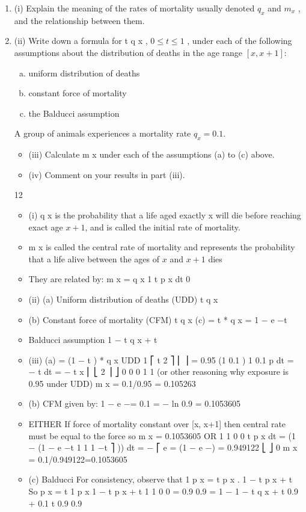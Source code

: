 \documentclass[a4paper,12pt]{article}
\begin{document}
\begin{enumerate}
\item (i) Explain the meaning of the rates of mortality usually denoted $q_x$ and $m_x$ , and the relationship between them.

\item (ii) Write down a formula for t q x , $0 \leq t \leq 1$ , under each of the following assumptions about the distribution of deaths in the age range $[x, x+1]$:
\begin{enumerate}[(a)]
\item uniform distribution of deaths
\item constant force of mortality
\item the Balducci assumption
\end{enumerate}
\medskip
A group of animals experiences a mortality rate $q_x = 0.1$.

\begin{itemize}
\item (iii) Calculate m x under each of the assumptions (a) to (c) above.
\item (iv) Comment on your results in part (iii).
\end{itemize}

\newpage
12
\begin{itemize}
\item (i)
q x is the probability that a life aged exactly x will die before reaching exact age $x+1$, and is called the initial rate of mortality.
\item m x is called the central rate of mortality and represents the probability that a life alive between the ages of $x$ and $x+1$ dies
\item They are related by:
m x =
q x
1
\int t p x dt
0
\item 
(ii)
(a)
Uniform distribution of deaths (UDD)
t q x
\item (b)
Constant force of mortality (CFM)
t q x
(c)
= t * q x
= 1 − e −\mu * t
\item Balducci assumption
1 − t q x + t
\item (iii)
(a)
= (1 − t ) * q x
UDD
1
⎡ t 2 ⎤
⎢ ⎥ = 0.95
(1
0.1
)
1
0.1
p
dt
=
−
t
dt
=
−
\int t x \int
⎢ ⎣ 2 ⎥ ⎦
0
0
0
1
1
(or other reasoning why exposure is 0.95
under UDD)
m x = 0.1/0.95 = 0.105263
\item (b)
CFM
\mu given by:
1 − e −\mu = 0.1
\mu = − ln 0.9 = 0.1053605
\item EITHER
If force of mortality constant over [x, x+1] then
central rate must be equal to the force \mu
so m x = 0.1053605
OR
1 1
0 0
\int t p x dt = \int (1 − (1 − e
−\mu t
1
1
1
−\mu t
⎤
)) dt = − ⎡ e
= (1 − e −\mu ) = 0.949122
\mu ⎣
⎦ 0 \mu
m x = 0.1/0.949122=0.1053605
\item (c)
Balducci
For consistency, observe that 1 p x = t p x . 1 − t p x + t
So
p x =
t
1 p x
1 − t
p x + t
1 1
0 0
=
0.9
0.9
=
1 − 1 − t q x + t 0.9 + 0.1 t
0.9
0.9


\end{itemize}
\end{enumerate}
\end{document}
